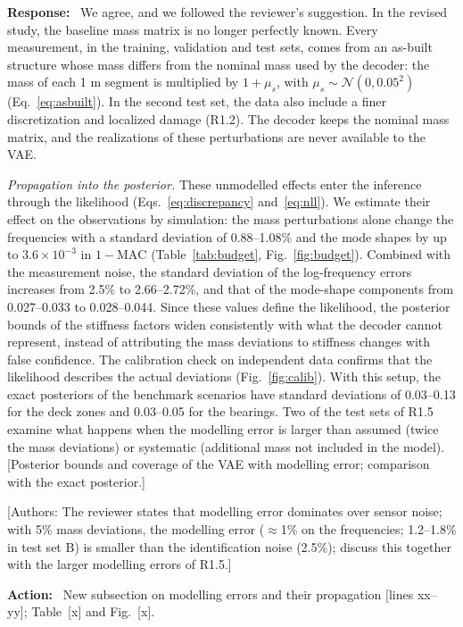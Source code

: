 \documentclass[11pt]{article}
\newenvironment{response}{\par\smallskip\noindent\color{resp}\textbf{Response:}\ }{\par}
\newenvironment{action}{\par\smallskip\noindent\color{resp}\textbf{Action:}\ }{\par}
\newcommand{\authornote}[1]{\textcolor{note}{\textsf{[Authors: #1]}}}
\newcommand{\tbd}[1]{\textcolor{note}{\textsf{[#1]}}}
\newcommand{\lines}[1]{\tbd{lines #1}}
\begin{document}
\begin{response}
We agree, and we followed the reviewer's suggestion. In the revised study, the baseline mass matrix is no longer
perfectly known. Every measurement, in the training, validation and test sets, comes from an as-built structure whose
mass differs from the nominal mass used by the decoder: the mass of each 1 m segment is multiplied by $1+\mu_s$, with
$\mu_s\sim\mathcal{N}(0,0.05^2)$ (Eq.~\eqref{eq:asbuilt}). In the second test set, the data also include a finer discretization and localized damage (R1.2).
The decoder keeps the nominal mass matrix, and the realizations of these perturbations are never available to the VAE.

\textit{Propagation into the posterior.} These unmodelled effects enter the inference through the likelihood
(Eqs.~\eqref{eq:discrepancy} and~\eqref{eq:nll}). We estimate their effect on the observations by simulation: the mass
perturbations alone change the frequencies with a standard deviation of 0.88--1.08\% and the mode shapes by up to
$3.6\times10^{-3}$ in $1-\mathrm{MAC}$ (Table~\ref{tab:budget}, Fig.~\ref{fig:budget}). Combined with the measurement
noise, the standard deviation of the log-frequency errors increases from 2.5\% to 2.66--2.72\%, and that of the
mode-shape components from 0.027--0.033 to 0.028--0.044. Since these values define the likelihood, the posterior bounds of the stiffness
factors widen consistently with what the decoder cannot represent, instead of attributing the mass deviations to
stiffness changes with false confidence. The calibration check on independent data confirms that the likelihood
describes the actual deviations (Fig.~\ref{fig:calib}). With this setup, the exact posteriors of the benchmark scenarios
have standard deviations of 0.03--0.13 for the deck zones and 0.03--0.05 for the bearings. Two of the test sets of R1.5
examine what happens when the modelling error is larger than assumed (twice the mass deviations) or
systematic (additional mass not included in the model).
\tbd{Posterior bounds and coverage of the VAE with modelling error; comparison with the exact posterior.}
\end{response}
\authornote{The reviewer states that modelling error dominates over sensor noise; with 5\% mass deviations, the
modelling error ($\approx$1\% on the frequencies; 1.2--1.8\% in test set B) is smaller than the identification noise (2.5\%); discuss this together with the larger
modelling errors of R1.5.}

\begin{action}
New subsection on modelling errors and their propagation \lines{xx--yy}; Table~\tbd{x} and Fig.~\tbd{x}.
\end{action}
\end{document}
